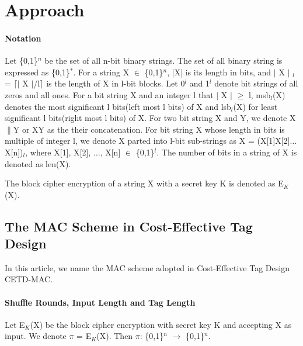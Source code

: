 \documentclass{article}
\begin{document}
\section{Approach}
\paragraph{Notation}
Let \{0,1\}$^n$ be the set of all n-bit binary strings. The set of all binary string is expressed as \{0,1\}$^*$.  
For a string X $\in$ \{0,1\}$^n$, |X| is its length in bits, and $\vert$ X $\vert$ $_l$ = $\lceil$$\vert$ X $\vert$/l$\rceil$ is the length of X in l-bit blocks.  Let 0$^l$ and 1$^l$ denote bit strings of all zeros and all ones. 
For a bit string X and an integer l that $\vert$ X $\vert$ $\geq$ l, msb$_l$(X) denotes the most significant l bits(left most l bits) of X and lsb$_l$(X) for least significant l bits(right most l bits) of X.
For two bit string X and Y, we denote X$\|$Y  or XY as the their concatenation. For bit string X whose length in bits is multiple of integer l, we denote X parted into l-bit sub-strings as X = (X[1]X[2]$\ldots$X[n])$_l$, where X[1], X[2], $\ldots$, X[n] $\in$ \{0,1\}$^l$.
The number of bits in a string of X is denoted as len(X).

The block cipher encryption of a string X with a secret key K is denoted as E$_K$(X).
\subsection{The MAC Scheme in Cost-Effective Tag Design}
In this article, we name the MAC scheme adopted in Cost-Effective Tag Design\cite{} CETD-MAC.  
\paragraph{Shuffle Rounds, Input Length and Tag Length}
Let E$_K$(X) be the block cipher encryption with secret key K and accepting X as input. We denote $\pi$ = E$_K$(X). Then $\pi$: \{0,1\}$^n$ $\rightarrow$
\{0,1\}$^n$.
\end{document}
